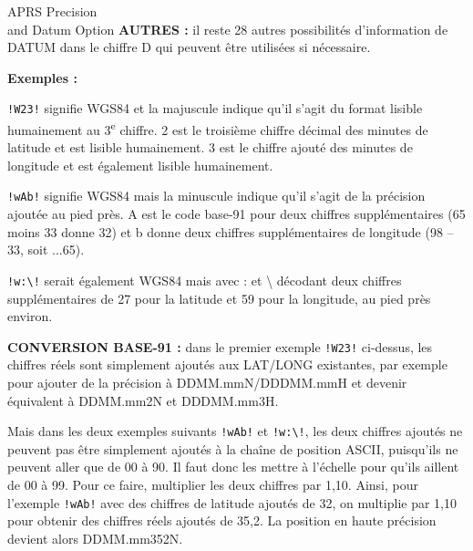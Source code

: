 \begin{aprssideblock}{APRS Precision\\and Datum Option}
\textbf{AUTRES :} il reste 28 autres possibilités d'information de DATUM
dans le chiffre D qui peuvent être utilisées si nécessaire.

\textbf{Exemples :}

\texttt{!W23!} signifie WGS84 et la majuscule indique qu'il s'agit du
format lisible humainement au 3\textsuperscript{e} chiffre. \guillemotleft{}2\guillemotright{}
est le troisième chiffre décimal des minutes de latitude et est lisible
humainement. \guillemotleft{}3\guillemotright{} est le chiffre ajouté des
minutes de longitude et est également lisible humainement.

\texttt{!wAb!} signifie WGS84 mais la minuscule indique qu'il s'agit de la
précision ajoutée au pied près. \guillemotleft{}A\guillemotright{} est le
code base-91 pour deux chiffres supplémentaires (65 moins 33 donne
\guillemotleft{}32\guillemotright{}) et \guillemotleft{}b\guillemotright{}
donne deux chiffres supplémentaires de longitude (98 -- 33, soit
\guillemotleft{}...65\guillemotright{}).

\texttt{!w:\textbackslash!} serait également WGS84 mais avec
\guillemotleft{}:\guillemotright{} et \guillemotleft{}\textbackslash\guillemotright{}
décodant deux chiffres supplémentaires de \guillemotleft{}27\guillemotright{}
pour la latitude et \guillemotleft{}59\guillemotright{} pour la longitude,
au pied près environ.

\textbf{CONVERSION BASE-91 :} dans le premier exemple \texttt{!W23!}
ci-dessus, les chiffres réels sont simplement ajoutés aux LAT/LONG
existantes, par exemple pour ajouter de la précision à DDMM.mmN/DDDMM.mmH
et devenir équivalent à DDMM.mm2N et DDDMM.mm3H.

Mais dans les deux exemples suivants \texttt{!wAb!} et \texttt{!w:\textbackslash!},
les deux chiffres ajoutés ne peuvent pas être simplement ajoutés à la chaîne
de position ASCII, puisqu'ils ne peuvent aller que de 00 à 90. Il faut donc
les mettre à l'échelle pour qu'ils aillent de 00 à 99. Pour ce faire,
multiplier les deux chiffres par 1,10. Ainsi, pour l'exemple
\texttt{!wAb!} avec des chiffres de latitude ajoutés de 32, on multiplie
par 1,10 pour obtenir des chiffres réels ajoutés de 35,2. La position en
haute précision devient alors DDMM.mm352N.
\end{aprssideblock}

